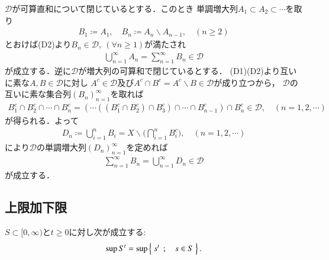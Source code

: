 	\begin{prf}
		$\mathscr{D}$が可算直和について閉じているとする．このとき
		単調増大列$A_1 \subset A_2 \subset \cdots$を取り
		\begin{align}
			B_1 \coloneqq A_1,
			\quad B_n \coloneqq A_n \backslash A_{n-1},
			\quad (n \geq 2)
		\end{align}
		とおけば(D2)より$B_n \in \mathscr{D},\ (\forall n \geq 1)$が満たされ
		\begin{align}
			\bigcup_{n=1}^{\infty} A_n = \sum_{n=1}^{\infty} B_n \in \mathscr{D} 
		\end{align}
		が成立する．逆に$\mathscr{D}$が増大列の可算和で閉じているとする．
		(D1)(D2)より互いに素な$A,B \in \mathscr{D}$に対し
		$A^c \in \mathscr{D}$及び$A^c \cap B^c = A^c \backslash B\in \mathscr{D}$が成り立つから，
		$\mathscr{D}$の互いに素な集合列$(B_n)_{n=1}^{\infty}$を取れば
		\begin{align}
			B_1^c \cap B_2^c \cap \cdots \cap B_n^c
			= \left( \cdots \left( \left( B_1^c \cap B_2^c \right) \cap B_3^c \right) \cap \cdots \cap B_{n-1}^c \right) \cap B_n^c
			\in \mathscr{D},
			\quad (n=1,2,\cdots)
		\end{align}
		が得られる．よって
		\begin{align}
			D_n \coloneqq \bigcup_{i=1}^n B_i = X \backslash \Biggl( \bigcap_{i=1}^n B_i^c \Biggr),
			\quad (n=1,2,\cdots)
		\end{align}
		により$\mathscr{D}$の単調増大列$(D_n)_{n=1}^{\infty}$を定めれば
		\begin{align}
			\sum_{n=1}^{\infty} B_n = \bigcup_{n=1}^{\infty} D_n \in \mathscr{D}
		\end{align}
		が成立する．
		\QED
	\end{prf}

\subsection{上限加下限}
	\begin{screen}
		\begin{thm}
			$S \subset [0,\infty)$と$t \geq 0$に対し次が成立する:
			\begin{align}
				\operatorname*{sup}_{} S^t = \operatorname*{sup}_{} \left\{\ s^t\ \, ; \quad s \in S\ \right\}.
			\end{align}
		\end{thm}
	\end{screen}
	
	
